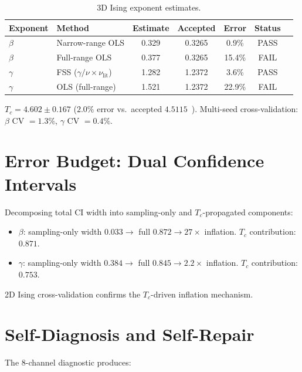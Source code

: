 \documentclass[11pt,a4paper]{article}
\begin{document}
\begin{table}[ht]
\centering
\caption{3D Ising exponent estimates.}
\label{tab:ising}
\begin{tabular}{@{}llccccl@{}}
\toprule
Exponent & Method & Estimate & Accepted & Error & Status \\
\midrule
$\beta$ & Narrow-range OLS & 0.329 & 0.3265 & 0.9\% & PASS \\
$\beta$ & Full-range OLS & 0.377 & 0.3265 & 15.4\% & FAIL \\
$\gamma$ & FSS ($\gamma/\nu \times \nu_{\text{lit}}$) & 1.282 & 1.2372 & 3.6\% & PASS \\
$\gamma$ & OLS (full-range) & 1.521 & 1.2372 & 22.9\% & FAIL \\
\bottomrule
\end{tabular}
\end{table}

$T_c = 4.602 \pm 0.167$ ($2.0\%$ error vs.\ accepted $4.5115$~\cite{hasenbusch2010}). Multi-seed cross-validation: $\beta$ CV $= 1.3\%$, $\gamma$ CV $= 0.4\%$.

\section{Error Budget: Dual Confidence Intervals}\label{sec:error_budget}

Decomposing total CI width into sampling-only and $T_c$-propagated components:
\begin{itemize}
  \item $\beta$: sampling-only width $0.033 \to$ full $0.872 \to 27\times$ inflation. $T_c$ contribution: $0.871$.
  \item $\gamma$: sampling-only width $0.384 \to$ full $0.845 \to 2.2\times$ inflation. $T_c$ contribution: $0.753$.
\end{itemize}
2D Ising cross-validation confirms the $T_c$-driven inflation mechanism.

\section{Self-Diagnosis and Self-Repair}\label{sec:diagnosis}

The 8-channel diagnostic produces:
\end{document}
